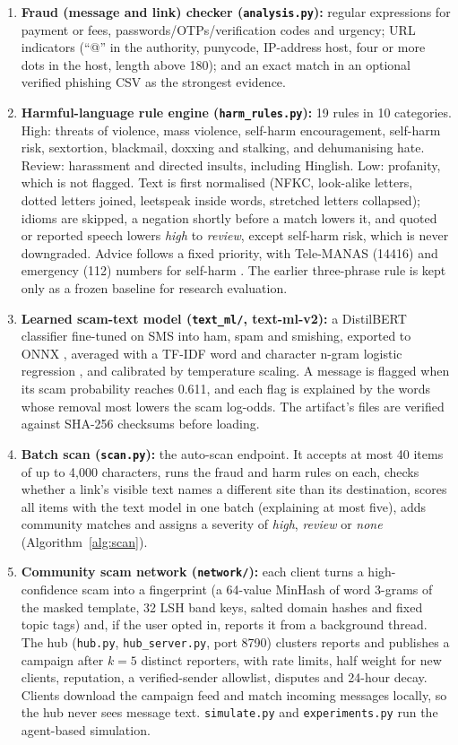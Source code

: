 \begin{enumerate}[label=\textbf{M\arabic*}, leftmargin=1.2cm]
\item \textbf{Fraud (message and link) checker (\texttt{analysis.py}):} regular expressions for payment or fees, passwords/OTPs/verification codes and urgency; URL indicators (``@'' in the authority, punycode, IP-address host, four or more dots in the host, length above 180); and an exact match in an optional verified phishing CSV as the strongest evidence.
\item \textbf{Harmful-language rule engine (\texttt{harm\_rules.py}):} 19 rules in 10 categories. High: threats of violence, mass violence, self-harm encouragement, self-harm risk, sextortion, blackmail, doxxing and stalking, and dehumanising hate. Review: harassment and directed insults, including Hinglish. Low: profanity, which is not flagged. Text is first normalised (NFKC, look-alike letters, dotted letters joined, leetspeak inside words, stretched letters collapsed); idioms are skipped, a negation shortly before a match lowers it, and quoted or reported speech lowers \emph{high} to \emph{review}, except self-harm risk, which is never downgraded. Advice follows a fixed priority, with Tele-MANAS (14416) and emergency (112) numbers for self-harm \cite{telemanas}. The earlier three-phrase rule is kept only as a frozen baseline for research evaluation.
\item \textbf{Learned scam-text model (\texttt{text\_ml/}, text-ml-v2):} a DistilBERT classifier \cite{distilbert} fine-tuned on SMS into ham, spam and smishing, exported to ONNX \cite{onnx}, averaged with a TF-IDF word and character n-gram logistic regression \cite{sklearn}, and calibrated by temperature scaling. A message is flagged when its scam probability reaches 0.611, and each flag is explained by the words whose removal most lowers the scam log-odds. The artifact's files are verified against SHA-256 checksums before loading.
\item \textbf{Batch scan (\texttt{scan.py}):} the auto-scan endpoint. It accepts at most 40 items of up to 4,000 characters, runs the fraud and harm rules on each, checks whether a link's visible text names a different site than its destination, scores all items with the text model in one batch (explaining at most five), adds community matches and assigns a severity of \emph{high}, \emph{review} or \emph{none} (Algorithm~\ref{alg:scan}).
\item \textbf{Community scam network (\texttt{network/}):} each client turns a high-confidence scam into a fingerprint (a 64-value MinHash of word 3-grams of the masked template, 32 LSH band keys, salted domain hashes and fixed topic tags) and, if the user opted in, reports it from a background thread. The hub (\texttt{hub.py}, \texttt{hub\_server.py}, port 8790) clusters reports and publishes a campaign after $k=5$ distinct reporters, with rate limits, half weight for new clients, reputation, a verified-sender allowlist, disputes and 24-hour decay. Clients download the campaign feed and match incoming messages locally, so the hub never sees message text. \texttt{simulate.py} and \texttt{experiments.py} run the agent-based simulation.

\end{enumerate}
